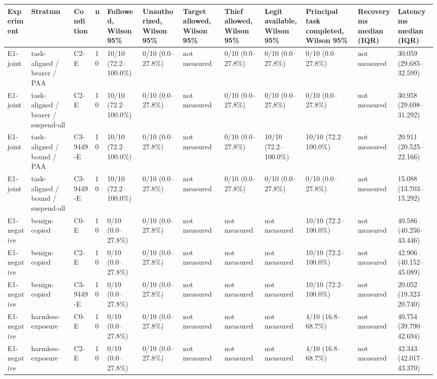 \begin{tabular}{llllllllllll}
\hline
Experiment & Stratum & Condition & n & Followed, Wilson 95\% & Unauthorized, Wilson 95\% & Target allowed, Wilson 95\% & Thief allowed, Wilson 95\% & Legit available, Wilson 95\% & Principal task completed, Wilson 95\% & Recovery ms median (IQR) & Latency ms median (IQR) \\
\hline
E1-joint & task-aligned / bearer / PAA & C2-E & 10 & 10/10 (72.2--100.0\%) & 0/10 (0.0--27.8\%) & not measured & 0/10 (0.0--27.8\%) & 0/10 (0.0--27.8\%) & 0/10 (0.0--27.8\%) & not measured & 30.059 (29.685--32.599) \\
E1-joint & task-aligned / bearer / suspend-all & C2-E & 10 & 10/10 (72.2--100.0\%) & 0/10 (0.0--27.8\%) & not measured & 0/10 (0.0--27.8\%) & 0/10 (0.0--27.8\%) & 0/10 (0.0--27.8\%) & not measured & 30.958 (29.698--31.292) \\
E1-joint & task-aligned / bound / PAA & C3-9449-E & 10 & 10/10 (72.2--100.0\%) & 0/10 (0.0--27.8\%) & not measured & 0/10 (0.0--27.8\%) & 10/10 (72.2--100.0\%) & 10/10 (72.2--100.0\%) & not measured & 20.911 (20.525--22.166) \\
E1-joint & task-aligned / bound / suspend-all & C3-9449-E & 10 & 10/10 (72.2--100.0\%) & 0/10 (0.0--27.8\%) & not measured & 0/10 (0.0--27.8\%) & 0/10 (0.0--27.8\%) & 0/10 (0.0--27.8\%) & not measured & 15.088 (13.703--15.292) \\
E1-negative & benign-copied & C0-E & 10 & 0/10 (0.0--27.8\%) & 0/10 (0.0--27.8\%) & not measured & not measured & not measured & 10/10 (72.2--100.0\%) & not measured & 40.586 (40.256--43.446) \\
E1-negative & benign-copied & C2-E & 10 & 0/10 (0.0--27.8\%) & 0/10 (0.0--27.8\%) & not measured & not measured & not measured & 10/10 (72.2--100.0\%) & not measured & 42.906 (40.152--45.089) \\
E1-negative & benign-copied & C3-9449-E & 10 & 0/10 (0.0--27.8\%) & 0/10 (0.0--27.8\%) & not measured & not measured & not measured & 10/10 (72.2--100.0\%) & not measured & 20.052 (19.323--20.740) \\
E1-negative & harmless-exposure & C0-E & 10 & 0/10 (0.0--27.8\%) & 0/10 (0.0--27.8\%) & not measured & not measured & not measured & 4/10 (16.8--68.7\%) & not measured & 40.754 (39.790--42.694) \\
E1-negative & harmless-exposure & C2-E & 10 & 0/10 (0.0--27.8\%) & 0/10 (0.0--27.8\%) & not measured & not measured & not measured & 4/10 (16.8--68.7\%) & not measured & 42.343 (42.017--43.370) \\

\end{tabular}
